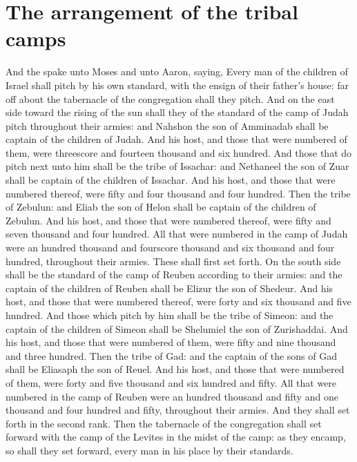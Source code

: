 \section*{The arrangement of the tribal camps}
\begin{biblechapter} %
\verse And the \LORD spake unto Moses and unto Aaron, saying,
\verse Every man of the children of Israel shall pitch by his own standard, with the ensign of their father's house: far off about the tabernacle of the congregation shall they pitch.
\verse And on the east side toward the rising of the sun shall they of the standard of the camp of Judah pitch throughout their armies: and Nahshon the son of Amminadab shall be captain of the children of Judah.
\verse And his host, and those that were numbered of them, were threescore and fourteen thousand and six hundred.
\verse And those that do pitch next unto him shall be the tribe of Issachar: and Nethaneel the son of Zuar shall be captain of the children of Issachar.
\verse And his host, and those that were numbered thereof, were fifty and four thousand and four hundred.
\verse Then the tribe of Zebulun: and Eliab the son of Helon shall be captain of the children of Zebulun.
\verse And his host, and those that were numbered thereof, were fifty and seven thousand and four hundred.
\verse All that were numbered in the camp of Judah were an hundred thousand and fourscore thousand and six thousand and four hundred, throughout their armies. These shall first set forth.
\verse On the south side shall be the standard of the camp of Reuben according to their armies: and the captain of the children of Reuben shall be Elizur the son of Shedeur.
\verse And his host, and those that were numbered thereof, were forty and six thousand and five hundred.
\verse And those which pitch by him shall be the tribe of Simeon: and the captain of the children of Simeon shall be Shelumiel the son of Zurishaddai.
\verse And his host, and those that were numbered of them, were fifty and nine thousand and three hundred.
\verse Then the tribe of Gad: and the captain of the sons of Gad shall be Eliasaph the son of Reuel.
\verse And his host, and those that were numbered of them, were forty and five thousand and six hundred and fifty.
\verse All that were numbered in the camp of Reuben were an hundred thousand and fifty and one thousand and four hundred and fifty, throughout their armies. And they shall set forth in the second rank.
\verse Then the tabernacle of the congregation shall set forward with the camp of the Levites in the midst of the camp: as they encamp, so shall they set forward, every man in his place by their standards.

\end{biblechapter}
